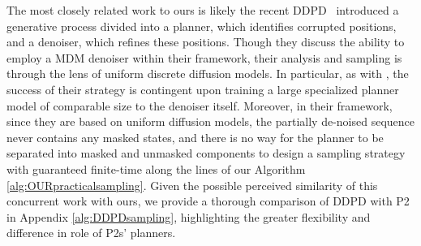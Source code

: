The most closely related work to ours is likely the recent
DDPD~\citep{ddpd} introduced a generative process divided into a planner, which identifies corrupted positions, and a denoiser, which refines these positions. Though they discuss the ability to employ a MDM denoiser within their framework, their analysis and sampling is through the lens of uniform discrete diffusion models. In particular, as with \cite{li2021discoveringnonmonotonicautoregressiveorderings}, the success of their strategy is contingent upon training a large specialized planner model of comparable size to the denoiser itself. Moreover, in their framework, since they are based on uniform diffusion models, the partially de-noised sequence never contains any masked states, and there is no way for the planner to be separated into masked and unmasked components to design a sampling strategy with guaranteed finite-time along the lines of our Algorithm \ref{alg:OURpracticalsampling}. Given the possible perceived similarity of this concurrent work with ours, we provide a thorough comparison of DDPD with P2 in Appendix \ref{alg:DDPDsampling}, highlighting the greater flexibility and difference in role of P2s' planners.
 



